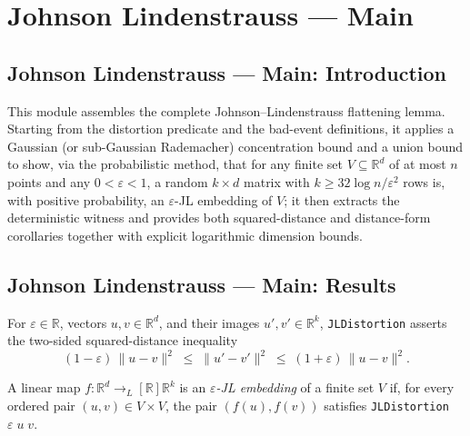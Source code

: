 \section{Johnson Lindenstrauss --- Main}
\subsection*{Johnson Lindenstrauss --- Main: Introduction}

This module assembles the complete Johnson--Lindenstrauss flattening lemma.
Starting from the distortion predicate and the bad-event definitions, it
applies a Gaussian (or sub-Gaussian Rademacher) concentration bound and a
union bound to show, via the probabilistic method, that for any finite set
$V \subseteq \mathbb{R}^d$ of at most $n$ points and any $0 < \varepsilon < 1$,
a random $k \times d$ matrix with $k \ge 32 \log n / \varepsilon^2$ rows is,
with positive probability, an $\varepsilon$-JL embedding of $V$; it then
extracts the deterministic witness and provides both squared-distance and
distance-form corollaries together with explicit logarithmic dimension bounds.

\subsection*{Johnson Lindenstrauss --- Main: Results}

\begin{definition}
\label{JLDistortion}
\leanok
For $\varepsilon \in \mathbb{R}$, vectors $u, v \in \mathbb{R}^d$, and their
images $u', v' \in \mathbb{R}^k$, \texttt{JLDistortion} asserts the two-sided
squared-distance inequality
\[
  (1 - \varepsilon)\,\|u - v\|^2 \;\le\; \|u' - v'\|^2 \;\le\;
  (1 + \varepsilon)\,\|u - v\|^2.
\]
\end{definition}

\begin{definition}
\label{IsJLEmbedding}
\leanok
{}
A linear map $f : \mathbb{R}^d \to_L[\mathbb{R}] \mathbb{R}^k$ is an
\emph{$\varepsilon$-JL embedding} of a finite set $V$ if, for every ordered
pair $(u, v) \in V \times V$, the pair $(f(u), f(v))$ satisfies
\texttt{JLDistortion} $\varepsilon\; u\; v$.
\end{definition}

